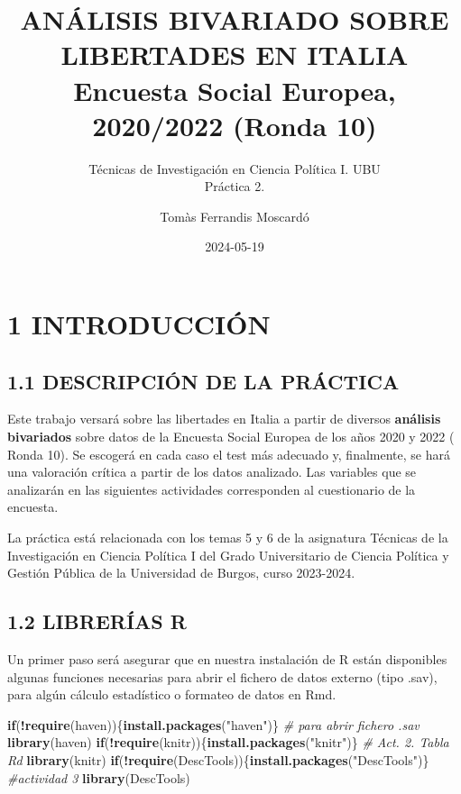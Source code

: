 \documentclass[
  12 pt,
  a4paper,
]{article}
\title{ANÁLISIS BIVARIADO SOBRE LIBERTADES EN ITALIA\\
Encuesta Social Europea, 2020/2022 (Ronda 10)}
\subtitle{Técnicas de Investigación en Ciencia Política I. UBU\\
Práctica 2.}
\author{Tomàs Ferrandis Moscardó}
\date{2024-05-19}
\newenvironment{Shaded}{\begin{snugshade}}{\end{snugshade}}
\newcommand{\CommentTok}[1]{\textcolor[rgb]{0.56,0.35,0.01}{\textit{#1}}}
\newcommand{\ControlFlowTok}[1]{\textcolor[rgb]{0.13,0.29,0.53}{\textbf{#1}}}
\newcommand{\FunctionTok}[1]{\textcolor[rgb]{0.13,0.29,0.53}{\textbf{#1}}}
\newcommand{\NormalTok}[1]{#1}
\newcommand{\SpecialCharTok}[1]{\textcolor[rgb]{0.81,0.36,0.00}{\textbf{#1}}}
\newcommand{\StringTok}[1]{\textcolor[rgb]{0.31,0.60,0.02}{#1}}
\begin{document}
\maketitle

{
\setcounter{tocdepth}{2}
\tableofcontents
}
\newpage

\renewcommand\tablename{Tabla}

\section{1 INTRODUCCIÓN}\label{introducciuxf3n}

\subsection{1.1 DESCRIPCIÓN DE LA
PRÁCTICA}\label{descripciuxf3n-de-la-pruxe1ctica}

Este trabajo versará sobre las libertades en Italia a partir de diversos
\textbf{análisis bivariados} sobre datos de la Encuesta Social Europea
de los años 2020 y 2022 ( Ronda 10). Se escogerá en cada caso el test
más adecuado y, finalmente, se hará una valoración crítica a partir de
los datos analizado. Las variables que se analizarán en las siguientes
actividades corresponden al cuestionario de la encuesta.

La práctica está relacionada con los temas 5 y 6 de la asignatura
Técnicas de la Investigación en Ciencia Política I del Grado
Universitario de Ciencia Política y Gestión Pública de la Universidad de
Burgos, curso 2023-2024.

\subsection{1.2 LIBRERÍAS R}\label{libreruxedas-r}

Un primer paso será asegurar que en nuestra instalación de R están
disponibles algunas funciones necesarias para abrir el fichero de datos
externo (tipo .sav), para algún cálculo estadístico o formateo de datos
en Rmd.

\begin{Shaded}
\begin{Highlighting}[]
\ControlFlowTok{if}\NormalTok{(}\SpecialCharTok{!}\FunctionTok{require}\NormalTok{(haven))\{}\FunctionTok{install.packages}\NormalTok{(}\StringTok{"haven"}\NormalTok{)\} }\CommentTok{\# para abrir fichero .sav}
\FunctionTok{library}\NormalTok{(haven)}
\ControlFlowTok{if}\NormalTok{(}\SpecialCharTok{!}\FunctionTok{require}\NormalTok{(knitr))\{}\FunctionTok{install.packages}\NormalTok{(}\StringTok{"knitr"}\NormalTok{)\} }\CommentTok{\# Act. 2. Tabla Rd}
\FunctionTok{library}\NormalTok{(knitr)}
\ControlFlowTok{if}\NormalTok{(}\SpecialCharTok{!}\FunctionTok{require}\NormalTok{(DescTools))\{}\FunctionTok{install.packages}\NormalTok{(}\StringTok{"DescTools"}\NormalTok{)\} }\CommentTok{\#actividad 3}
\FunctionTok{library}\NormalTok{(DescTools)}
\end{Highlighting}
\end{Shaded}
\end{document}
